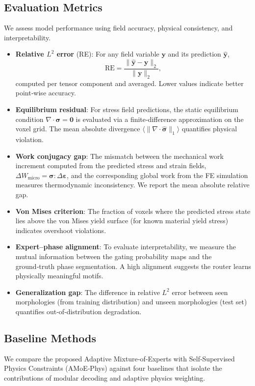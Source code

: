 \documentclass{article}
\begin{document}
\subsection{Evaluation Metrics}
We assess model performance using field accuracy, physical consistency, and interpretability.

\begin{itemize}
    \item \textbf{Relative $L^2$ error} (RE): For any field variable $\mathbf{y}$ and its prediction $\hat{\mathbf{y}}$,
    \[
    \text{RE} = \frac{\|\hat{\mathbf{y}} - \mathbf{y}\|_2}{\|\mathbf{y}\|_2},
    \]
    computed per tensor component and averaged. Lower values indicate better point‑wise accuracy.
    \item \textbf{Equilibrium residual}: For stress field predictions, the static equilibrium condition $\nabla \cdot \boldsymbol{\sigma} = \mathbf{0}$ is evaluated via a finite‑difference approximation on the voxel grid. The mean absolute divergence $\langle \|\nabla \cdot \hat{\boldsymbol{\sigma}}\|_1 \rangle$ quantifies physical violation.
    \item \textbf{Work conjugacy gap}: The mismatch between the mechanical work increment computed from the predicted stress and strain fields, $\Delta W_{\text{micro}} = \boldsymbol{\sigma} : \Delta \boldsymbol{\varepsilon}$, and the corresponding global work from the FE simulation measures thermodynamic inconsistency. We report the mean absolute relative gap.
    \item \textbf{Von Mises criterion}: The fraction of voxels where the predicted stress state lies above the von Mises yield surface (for known material yield stress) indicates overshoot violations.
    \item \textbf{Expert–phase alignment}: To evaluate interpretability, we measure the mutual information between the gating probability maps and the ground‑truth phase segmentation. A high alignment suggests the router learns physically meaningful motifs.
    \item \textbf{Generalization gap}: The difference in relative $L^2$ error between seen morphologies (from training distribution) and unseen morphologies (test set) quantifies out‑of‑distribution degradation.
\end{itemize}

\subsection{Baseline Methods}
We compare the proposed Adaptive Mixture‑of‑Experts with Self‑Supervised Physics Constraints (AMoE‑Phys) against four baselines that isolate the contributions of modular decoding and adaptive physics weighting.
\end{document}
